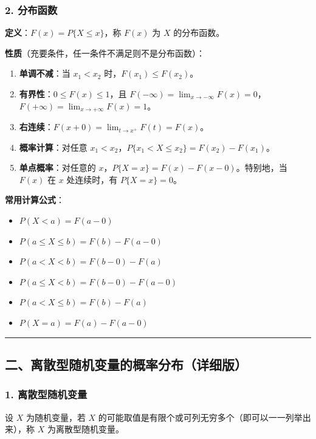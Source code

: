\documentclass[12pt,a4paper]{ctexart}
\begin{document}
\subsubsection{2. 分布函数}
\textbf{定义}：$F(x) = P\{X \le x\}$，称 $F(x)$ 为 $X$ 的分布函数。

\textbf{性质}（充要条件，任一条件不满足则不是分布函数）：
\begin{enumerate}[noitemsep]
    \item \textbf{单调不减}：当 $x_1 < x_2$ 时，$F(x_1) \le F(x_2)$。
    \item \textbf{有界性}：$0 \le F(x) \le 1$，且 $F(-\infty) = \lim_{x \to -\infty} F(x) = 0$，$F(+\infty) = \lim_{x \to +\infty} F(x) = 1$。
    \item \textbf{右连续}：$F(x+0) = \lim_{t \to x^+} F(t) = F(x)$。
    \item \textbf{概率计算}：对任意 $x_1 < x_2$，$P\{x_1 < X \le x_2\} = F(x_2) - F(x_1)$。
    \item \textbf{单点概率}：对任意的 $x$，$P\{X = x\} = F(x) - F(x-0)$。特别地，当 $F(x)$ 在 $x$ 处连续时，有 $P\{X = x\} = 0$。
\end{enumerate}

\textbf{常用计算公式}：
\begin{itemize}[noitemsep]
    \item $P(X < a) = F(a-0)$
    \item $P(a \le X \le b) = F(b) - F(a-0)$
    \item $P(a < X < b) = F(b-0) - F(a)$
    \item $P(a \le X < b) = F(b-0) - F(a-0)$
    \item $P(a < X \le b) = F(b) - F(a)$
    \item $P(X = a) = F(a) - F(a-0)$
\end{itemize}

\vspace{1em}\hrule\vspace{1em}

\subsection{二、离散型随机变量的概率分布（详细版）}

\subsubsection{1. 离散型随机变量}
设 $X$ 为随机变量，若 $X$ 的可能取值是有限个或可列无穷多个（即可以一一列举出来），称 $X$ 为离散型随机变量。
\end{document}

